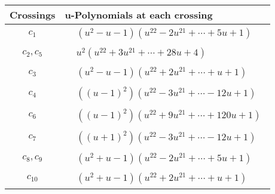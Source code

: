 \documentclass[1p]{elsarticle_modified}
\theoremstyle{definition}
\begin{document}
\begin{tabular}{m{50pt}|m{274pt}}
Crossings & \hspace{64pt}u-Polynomials at each crossing \\
\hline $$\begin{aligned}c_{1}\end{aligned}$$&$\begin{aligned}
&(u^2- u-1)(u^{22}-2 u^{21}+\cdots+5 u+1)
\end{aligned}$\\
\hline $$\begin{aligned}c_{2},c_{5}\end{aligned}$$&$\begin{aligned}
&u^2(u^{22}+3 u^{21}+\cdots+28 u+4)
\end{aligned}$\\
\hline $$\begin{aligned}c_{3}\end{aligned}$$&$\begin{aligned}
&(u^2- u-1)(u^{22}+2 u^{21}+\cdots+u+1)
\end{aligned}$\\
\hline $$\begin{aligned}c_{4}\end{aligned}$$&$\begin{aligned}
&((u-1)^2)(u^{22}-3 u^{21}+\cdots-12 u+1)
\end{aligned}$\\
\hline $$\begin{aligned}c_{6}\end{aligned}$$&$\begin{aligned}
&((u-1)^2)(u^{22}+9 u^{21}+\cdots+120 u+1)
\end{aligned}$\\
\hline $$\begin{aligned}c_{7}\end{aligned}$$&$\begin{aligned}
&((u+1)^2)(u^{22}-3 u^{21}+\cdots-12 u+1)
\end{aligned}$\\
\hline $$\begin{aligned}c_{8},c_{9}\end{aligned}$$&$\begin{aligned}
&(u^2+u-1)(u^{22}-2 u^{21}+\cdots+5 u+1)
\end{aligned}$\\
\hline $$\begin{aligned}c_{10}\end{aligned}$$&$\begin{aligned}
&(u^2+u-1)(u^{22}+2 u^{21}+\cdots+u+1)
\end{aligned}$\\
\hline
\end{tabular}\newpage\renewcommand{\arraystretch}{1}
\end{document}
